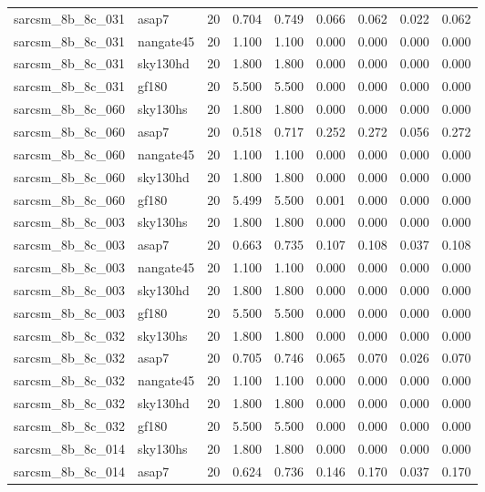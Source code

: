 \begin{tabular}{llrrrrrrr}
sarcsm\_8b\_8c\_031 & asap7 & 20 & 0.704 & 0.749 & 0.066 & 0.062 & 0.022 & 0.062 \\
sarcsm\_8b\_8c\_031 & nangate45 & 20 & 1.100 & 1.100 & 0.000 & 0.000 & 0.000 & 0.000 \\
sarcsm\_8b\_8c\_031 & sky130hd & 20 & 1.800 & 1.800 & 0.000 & 0.000 & 0.000 & 0.000 \\
sarcsm\_8b\_8c\_031 & gf180 & 20 & 5.500 & 5.500 & 0.000 & 0.000 & 0.000 & 0.000 \\
sarcsm\_8b\_8c\_060 & sky130hs & 20 & 1.800 & 1.800 & 0.000 & 0.000 & 0.000 & 0.000 \\
sarcsm\_8b\_8c\_060 & asap7 & 20 & 0.518 & 0.717 & 0.252 & 0.272 & 0.056 & 0.272 \\
sarcsm\_8b\_8c\_060 & nangate45 & 20 & 1.100 & 1.100 & 0.000 & 0.000 & 0.000 & 0.000 \\
sarcsm\_8b\_8c\_060 & sky130hd & 20 & 1.800 & 1.800 & 0.000 & 0.000 & 0.000 & 0.000 \\
sarcsm\_8b\_8c\_060 & gf180 & 20 & 5.499 & 5.500 & 0.001 & 0.000 & 0.000 & 0.000 \\
sarcsm\_8b\_8c\_003 & sky130hs & 20 & 1.800 & 1.800 & 0.000 & 0.000 & 0.000 & 0.000 \\
sarcsm\_8b\_8c\_003 & asap7 & 20 & 0.663 & 0.735 & 0.107 & 0.108 & 0.037 & 0.108 \\
sarcsm\_8b\_8c\_003 & nangate45 & 20 & 1.100 & 1.100 & 0.000 & 0.000 & 0.000 & 0.000 \\
sarcsm\_8b\_8c\_003 & sky130hd & 20 & 1.800 & 1.800 & 0.000 & 0.000 & 0.000 & 0.000 \\
sarcsm\_8b\_8c\_003 & gf180 & 20 & 5.500 & 5.500 & 0.000 & 0.000 & 0.000 & 0.000 \\
sarcsm\_8b\_8c\_032 & sky130hs & 20 & 1.800 & 1.800 & 0.000 & 0.000 & 0.000 & 0.000 \\
sarcsm\_8b\_8c\_032 & asap7 & 20 & 0.705 & 0.746 & 0.065 & 0.070 & 0.026 & 0.070 \\
sarcsm\_8b\_8c\_032 & nangate45 & 20 & 1.100 & 1.100 & 0.000 & 0.000 & 0.000 & 0.000 \\
sarcsm\_8b\_8c\_032 & sky130hd & 20 & 1.800 & 1.800 & 0.000 & 0.000 & 0.000 & 0.000 \\
sarcsm\_8b\_8c\_032 & gf180 & 20 & 5.500 & 5.500 & 0.000 & 0.000 & 0.000 & 0.000 \\
sarcsm\_8b\_8c\_014 & sky130hs & 20 & 1.800 & 1.800 & 0.000 & 0.000 & 0.000 & 0.000 \\
sarcsm\_8b\_8c\_014 & asap7 & 20 & 0.624 & 0.736 & 0.146 & 0.170 & 0.037 & 0.170 \\

\end{tabular}

